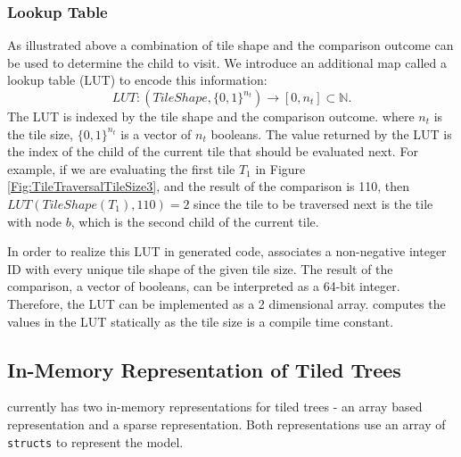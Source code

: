 \subsubsection{Lookup Table}
\label{sec:LookupTable}
As illustrated above a combination of tile shape and the comparison outcome can be used to determine the child to visit. 
We introduce an additional map called a lookup table (LUT) to encode this information:
\[
LUT : (TileShape, \{0, 1\}^{n_t}) \rightarrow [0, n_t] \subset \mathbb{N}.
\]
The LUT is indexed by 
the tile shape and the comparison outcome. 
where $n_t$ is the tile size, $\{0, 1\}^{n_t}$ is a vector of $n_t$ booleans. The value returned by the LUT is the index of
the child of the current tile that should be evaluated next. For example, if we are evaluating the first tile $T_1$ in 
Figure \ref{Fig:TileTraversalTileSize3}, and the result of the comparison is 110, then $LUT(TileShape(T_1), 110)=2$ since 
the tile %
to be traversed next is the tile with node $b$, which is the second child of the current tile.

In order to realize this LUT in generated code, \Treebeard{} associates a non-negative integer ID with every unique tile shape of the
given tile size. The result of the comparison, a vector of booleans, can be interpreted as a 64-bit integer. Therefore, the LUT
can be implemented as a 2 dimensional array. \Treebeard{} computes the values in the LUT statically as the tile size is a compile time constant.

\subsection{In-Memory Representation of Tiled Trees}
\label{Sec:MemoryRep}
\Treebeard{} currently has two in-memory representations for tiled trees - an array based representation and a sparse representation.
Both representations use an array of \texttt{structs} to represent the model. 

